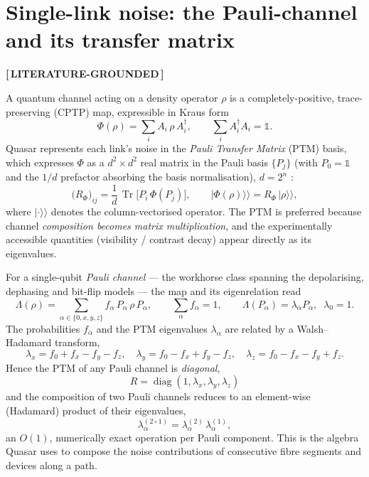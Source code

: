 \documentclass[11pt]{article}
\newcommand{\statusVerified}{\textbf{\color{verified}[\,LITERATURE-GROUNDED\,]}}
\newcommand{\Tr}{\operatorname{Tr}}
\begin{document}
\section{Single-link noise: the Pauli-channel and its transfer matrix}
\statusVerified

A quantum channel acting on a density operator $\rho$ is a completely-positive,
trace-preserving (CPTP) map, expressible in Kraus form \cite{nielsenchuang}
\begin{equation}
\Phi(\rho)=\sum_i A_i\,\rho\,A_i^{\dagger},
\qquad \sum_i A_i^{\dagger}A_i=\mathbb{1}.
\end{equation}
Quasar represents each link's noise in the \emph{Pauli Transfer Matrix} (PTM) basis, which
expresses $\Phi$ as a $d^2\!\times\!d^2$ real matrix in the Pauli basis
$\{P_j\}$ (with $P_0=\mathbb{1}$ and the $1/d$ prefactor absorbing the basis normalisation),
$d=2^n$ \cite{ptm_recon}:
\begin{equation}
\big(R_{\Phi}\big)_{ij}=\frac{1}{d}\,\Tr\!\big[P_i\,\Phi(P_j)\big],
\qquad |\Phi(\rho)\rangle\!\rangle = R_{\Phi}\,|\rho\rangle\!\rangle,
\end{equation}
where $|\cdot\rangle\!\rangle$ denotes the column-vectorised operator. The PTM is preferred
because channel \emph{composition becomes matrix multiplication}, and the experimentally
accessible quantities (visibility / contrast decay) appear directly as its eigenvalues.

For a single-qubit \emph{Pauli channel} --- the workhorse class spanning the depolarising,
dephasing and bit-flip models --- the map and its eigenrelation read \cite{stt_pauli}
\begin{equation}
\Lambda(\rho)=\!\!\sum_{\alpha\in\{0,x,y,z\}}\!\! f_\alpha\,P_\alpha\,\rho\,P_\alpha,
\qquad \sum_\alpha f_\alpha = 1,
\qquad \Lambda(P_\alpha)=\lambda_\alpha P_\alpha,\;\; \lambda_0=1 .
\end{equation}
The probabilities $f_\alpha$ and the PTM eigenvalues $\lambda_\alpha$ are related by a
Walsh--Hadamard transform,
\begin{equation}
\lambda_x=f_0+f_x-f_y-f_z,\quad
\lambda_y=f_0-f_x+f_y-f_z,\quad
\lambda_z=f_0-f_x-f_y+f_z .
\end{equation}
Hence the PTM of any Pauli channel is \emph{diagonal},
\begin{equation}
\boxed{\;R=\operatorname{diag}(1,\lambda_x,\lambda_y,\lambda_z)\;}
\end{equation}
and the composition of two Pauli channels reduces to an element-wise (Hadamard) product of
their eigenvalues,
\begin{equation}
\lambda^{(2\circ1)}_\alpha=\lambda^{(2)}_\alpha\,\lambda^{(1)}_\alpha ,
\end{equation}
an $O(1)$, numerically exact operation per Pauli component. This is the algebra Quasar uses
to compose the noise contributions of consecutive fibre segments and devices along a path.
\end{document}
